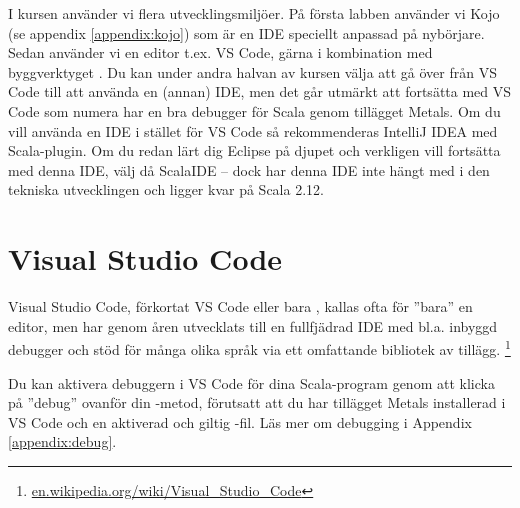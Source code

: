 I kursen använder vi flera utvecklingsmiljöer. På första labben använder vi Kojo (se appendix \ref{appendix:kojo}) som är en IDE speciellt anpassad på nybörjare. Sedan använder vi en editor t.ex. VS Code, gärna i kombination med byggverktyget . Du kan under andra halvan av kursen välja att gå över från VS Code till att använda en (annan) IDE, men det går utmärkt att fortsätta med VS Code som numera har en bra debugger för Scala genom tillägget Metals. Om du vill använda en IDE i stället för VS Code så rekommenderas IntelliJ IDEA med Scala-plugin. 
Om du redan lärt dig Eclipse på djupet och verkligen vill fortsätta med denna IDE, välj då ScalaIDE -- dock har denna IDE inte hängt med i den tekniska utvecklingen och ligger kvar på Scala 2.12. 

\section{Visual Studio Code}\label{appendix:ide:vscode}

Visual Studio Code, förkortat VS Code eller bara , kallas ofta för ''bara'' en editor, men har genom åren utvecklats till en fullfjädrad IDE med bl.a. inbyggd debugger och stöd för många olika språk via ett omfattande bibliotek av tillägg.%
\footnote{\href{https://en.wikipedia.org/wiki/Visual\_Studio\_Code}{en.wikipedia.org/wiki/Visual\_Studio\_Code}}

Du kan aktivera debuggern i VS Code för dina Scala-program genom att klicka på ''debug'' ovanför din -metod, förutsatt att du har tillägget Metals installerad i VS Code och en aktiverad och giltig -fil. Läs mer om debugging i Appendix \ref{appendix:debug}.  




\newpage



